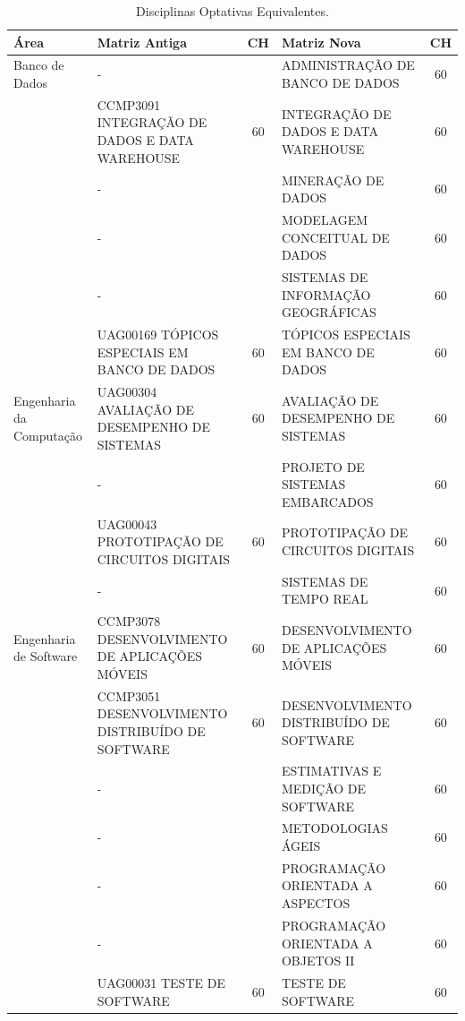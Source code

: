 \begin{center}
  
  \begin{tiny}
    \begin{longtable}{p{2cm}p{5.4cm}cp{5.4cm}c}
      \caption{\label{quadro:disciplinas-optativas-equivalentes}Disciplinas Optativas Equivalentes.}\\
    \toprule
    \textbf{Área} & \textbf{Matriz Antiga} & \textbf{CH} & \textbf{Matriz Nova} & \textbf{CH}\\
    \midrule
  Banco de Dados & - & & ADMINISTRAÇÃO DE BANCO DE DADOS & 60 \\ \cline{2-5}
    & CCMP3091 INTEGRAÇÃO DE DADOS E DATA WAREHOUSE & 60 & INTEGRAÇÃO DE DADOS E DATA WAREHOUSE & 60 \\ \cline{2-5}
    & - & & MINERAÇÃO DE DADOS & 60 \\ \cline{2-5}
    & - & & MODELAGEM CONCEITUAL DE DADOS & 60 \\ \cline{2-5}
    & - & & SISTEMAS DE INFORMAÇÃO GEOGRÁFICAS & 60 \\ \cline{2-5}
    & UAG00169 TÓPICOS ESPECIAIS EM BANCO DE DADOS & 60 & TÓPICOS ESPECIAIS EM BANCO DE DADOS & 60 \\ \midrule
  Engenharia da Computação & UAG00304 AVALIAÇÃO DE DESEMPENHO DE SISTEMAS & 60 & AVALIAÇÃO DE DESEMPENHO DE SISTEMAS & 60 \\ \cline{2-5}
    & - & & PROJETO DE SISTEMAS EMBARCADOS & 60 \\ \cline{2-5}
    & UAG00043 PROTOTIPAÇÃO DE CIRCUITOS DIGITAIS & 60 & PROTOTIPAÇÃO DE CIRCUITOS DIGITAIS & 60 \\ \cline{2-5}
    & - & & SISTEMAS DE TEMPO REAL & 60 \\ \midrule
  Engenharia de Software & CCMP3078 DESENVOLVIMENTO DE APLICAÇÕES MÓVEIS & 60 & DESENVOLVIMENTO DE APLICAÇÕES MÓVEIS & 60 \\ \cline{2-5}
  & CCMP3051 DESENVOLVIMENTO DISTRIBUÍDO DE SOFTWARE & 60 & DESENVOLVIMENTO DISTRIBUÍDO DE SOFTWARE & 60 \\ \cline{2-5}
    & - & & ESTIMATIVAS E MEDIÇÃO DE SOFTWARE & 60 \\ \cline{2-5}
    & - & & METODOLOGIAS ÁGEIS & 60 \\ \cline{2-5}
    & - & & PROGRAMAÇÃO ORIENTADA A ASPECTOS & 60 \\ \cline{2-5}
    & - & & PROGRAMAÇÃO ORIENTADA A OBJETOS II & 60 \\ \cline{2-5}
    & UAG00031 TESTE DE SOFTWARE & 60 & TESTE DE SOFTWARE & 60 \\ \cline{2-5}

\end{longtable}
\end{tiny}
\end{center}
